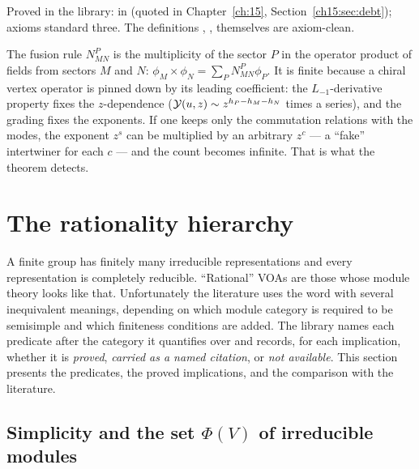 \begin{status}
Proved in the library:  in
 (quoted in Chapter~\ref{ch:15},
Section~\ref{ch15:sec:debt}); axioms standard three. The definitions , ,
 themselves are axiom-clean.
\end{status}

\begin{physics}
The fusion rule $N_{MN}^P$ is the multiplicity of the sector $P$ in the operator product of fields from sectors $M$ and $N$:
$\phi_M\times\phi_N = \sum_PN_{MN}^P\phi_P$. It is finite because a chiral vertex operator is pinned down by its leading
coefficient: the $L_{-1}$-derivative property fixes the $z$-dependence ($\mathcal{Y}(u,z)\sim z^{h_P-h_M-h_N}$ times a series),
and the grading fixes the exponents. If one keeps only the commutation relations with the modes, the exponent $z^{s}$ can be
multiplied by an arbitrary $z^c$ --- a ``fake'' intertwiner for each $c$ --- and the count becomes infinite. That is what the
theorem detects.
\end{physics}

\section{The rationality hierarchy}\label{l12:sec:rationality}

A finite group has finitely many irreducible representations and every representation is completely reducible.
``Rational'' VOAs are those whose module theory looks like that. Unfortunately the literature uses the word with
several inequivalent meanings, depending on which module category is required to be semisimple and which
finiteness conditions are added. The library names each predicate after the category it quantifies over and
records, for each implication, whether it is \emph{proved}, \emph{carried as a named citation}, or \emph{not
available}. This section presents the predicates, the proved implications, and the comparison with the literature.

\subsection{Simplicity and the set \texorpdfstring{$\Phi(V)$}{Phi(V)} of irreducible modules}

